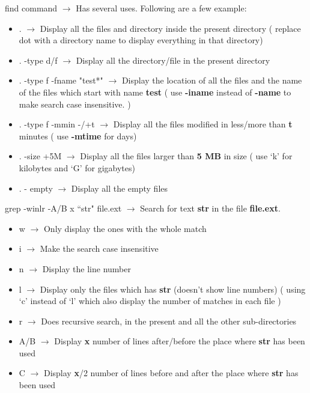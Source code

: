 \documentclass[twoside,a4paper]{article}
\newcommand{\tcb}{\color{blue}}
\newcommand{\tcr}{\color{red}}
\newcommand{\tcg}{\color{gray}}
\newcommand{\tck}{\color{black}}
\newcommand{\ra }{$\rightarrow$ }
\newcommand{\hs}{\hspace}
\begin{document}
\begin{multicols}{2}
    \tcr  find \tcb  command \tck \ra Has
    several uses. Following are a few example:\\
    \tck
    \begin{itemize}
        \item \tcb  . \tck \ra Display all the
              files and directory inside the present directory ( replace dot
              with a directory name to display everything in that directory)
        \item \tcb  . -type d/f \tck \ra
              Display all the directory/file in the present directory
        \item \tcb  . -type f -fname "test*" \tck
              \ra Display the location of all the files and the
              name of the files which start with name \textbf{test}
              \tcg  ( use \textbf{-iname} instead of \textbf{-name}
              to make search case insensitive. )\tck
        \item \tcb  . -type f -mmin -/+t \tck
              \ra Display all the files modified in less/more than
              \textbf{t} minutes \tcg ( use \textbf{-mtime} for days)
              \tck
        \item \tck  \tcb  . -size +5M
              \tck  \ra Display all the files larger than
              \textbf{5 MB} in size \tcg ( use `k' for kilobytes and
              `G' for gigabytes)\tck
        \item \tck  \tcb  . - empty \tck
              \ra Display all the empty files
    \end{itemize}

    \hs{-0.6 cm}\tcr  grep \tcb  -winlr -A/B x ``str"
    file.ext \tck  \ra Search for text \textbf{str} in
    the file \textbf{file.ext}.\\
    \tck
    \begin{itemize}
        \item \tcr  w \tck  \ra Only display
              the ones with the whole match
        \item \tcr  i \tck  \ra Make the search
              case insensitive
        \item \tcr  n \tck  \ra Display the
              line number \item \tcr  l \tck  $\rightarrow$
              Display only the files which has \textbf{str} (doesn't show
              line numbers) \tcg ( using `c' instead of `l' which
              also display the number of matches in each file ) \tck
        \item \tcr  r \tck  \ra Does recursive
              search, in the present and all the other sub-directories
        \item \tcr  \tck  A/B \ra Display
              \textbf{x} number of lines after/before the place where
              \textbf{str} has been used
        \item \tcr  C \tck  \ra Display
              \textbf{x}/2 number of lines before and after the place where
              \textbf{str} has been used
    \end{itemize}


\end{multicols}
\end{document}
